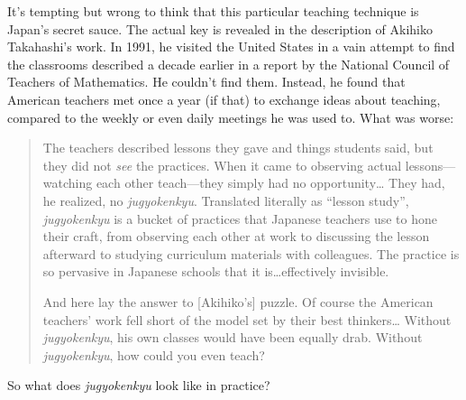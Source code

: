 It's tempting but wrong to think that this particular teaching technique
is Japan's secret sauce. The actual key is revealed in the description
of Akihiko Takahashi's work. In 1991, he visited the United States in a
vain attempt to find the classrooms described a decade earlier in a
report by the National Council of Teachers of Mathematics. He couldn't
find them. Instead, he found that American teachers met once a year (if
that) to exchange ideas about teaching, compared to the weekly or even
daily meetings he was used to. What was worse:

\begin{quote}
The teachers described lessons they gave and things students said, but
they did not \emph{see} the practices. When it came to observing actual
lessons---watching each other teach---they simply had no
opportunity\ldots{} They had, he realized, no \emph{jugyokenkyu}.
Translated literally as ``lesson study'', \emph{jugyokenkyu} is a bucket
of practices that Japanese teachers use to hone their craft, from
observing each other at work to discussing the lesson afterward to
studying curriculum materials with colleagues. The practice is so
pervasive in Japanese schools that it is\ldots{}effectively invisible.

And here lay the answer to {[}Akihiko's{]} puzzle. Of course the
American teachers' work fell short of the model set by their best
thinkers\ldots{} Without \emph{jugyokenkyu}, his own classes would have
been equally drab. Without \emph{jugyokenkyu}, how could you even teach?
\end{quote}

So what does \emph{jugyokenkyu} look like in practice?

